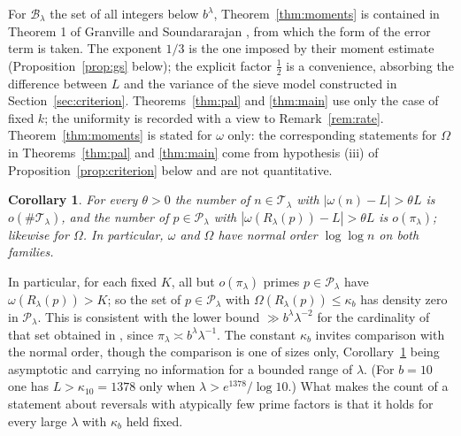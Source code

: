 \documentclass[11pt,a4paper]{article}
\theoremstyle{plain}
\newtheorem{corollary}[theorem]{Corollary}
\theoremstyle{definition}
\numberwithin{equation}{section}
\begin{document}
For $\mathcal B_\lambda$ the set of all integers below $b^{\lambda}$, Theorem~\ref{thm:moments} is
contained in Theorem 1 of Granville and Soundararajan \cite{GS}, from which the form of the error term
is taken. The exponent $1/3$ is the one imposed by their moment estimate (Proposition~\ref{prop:gs}
below); the explicit factor $\frac12$ is a convenience, absorbing the difference between $L$ and the
variance of the sieve model constructed in Section~\ref{sec:criterion}. Theorems~\ref{thm:pal} and
\ref{thm:main} use only the case of fixed $k$; the uniformity is recorded with a view to
Remark~\ref{rem:rate}. Theorem~\ref{thm:moments} is stated for $\omega$ only: the corresponding
statements for $\Omega$ in Theorems~\ref{thm:pal} and \ref{thm:main} come from hypothesis (iii) of
Proposition~\ref{prop:criterion} below and are not quantitative.

\begin{corollary}\label{cor:normalorder}
For every $\theta>0$ the number of $n\in\mathcal T_\lambda$ with $|\omega(n)-L|>\theta L$ is
$o(\#\mathcal T_\lambda)$, and the number of $p\in\mathcal P_\lambda$ with
$|\omega(R_\lambda(p))-L|>\theta L$ is $o(\pi_\lambda)$; likewise for $\Omega$. In particular,
$\omega$ and $\Omega$ have normal order $\log\log n$ on both families.
\end{corollary}

In particular, for each fixed $K$, all but $o(\pi_\lambda)$ primes $p\in\mathcal P_\lambda$ have
$\omega(R_\lambda(p))>K$; so the set of $p\in\mathcal P_\lambda$ with $\Omega(R_\lambda(p))\le\kappa_b$
has density zero in $\mathcal P_\lambda$. This is consistent with the lower bound
$\gg b^{\lambda}\lambda^{-2}$ for the cardinality of that set obtained in \cite{DRS}, since
$\pi_\lambda\asymp b^{\lambda}\lambda^{-1}$.
The constant $\kappa_b$ invites comparison with the normal order, though the comparison is one of
sizes only, Corollary~\ref{cor:normalorder} being asymptotic and carrying no information for a
bounded range of $\lambda$. (For $b=10$ one has $L>\kappa_{10}=1378$ only when
$\lambda>e^{1378}/\log10$.) What makes the count of \cite{DRS} a statement about reversals with
atypically few prime factors is that it holds for every large $\lambda$ with $\kappa_b$ held fixed.
\end{document}
